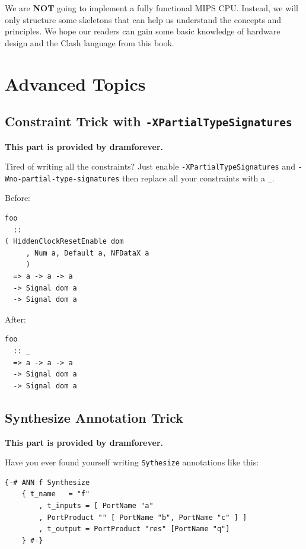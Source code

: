 \documentclass[a4paper,12pt, oneside]{book}
\begin{document}
We are \textbf{NOT} going to implement a fully functional MIPS CPU. Instead, we will only structure some skeletons that can help us understand the concepts and principles. We hope our readers can gain some basic knowledge of hardware design and the Clash language from this book.

\tableofcontents

\mainmatter




\backmatter
\appendix
\chapter{Advanced Topics}
\section*{Constraint Trick with \texttt{-XPartialTypeSignatures}}
\textbf{This part is provided by dramforever.}

Tired of writing all the  constraints? Just enable \texttt{-XPartialTypeSignatures} and \texttt{-Wno-partial-type-signatures} then replace all your constraints with a \texttt{_}.

Before:

\begin{verbatim}
foo 
  ::
( HiddenClockResetEnable dom
     , Num a, Default a, NFDataX a
     )
  => a -> a -> a
  -> Signal dom a
  -> Signal dom a
\end{verbatim}

After:

\begin{verbatim}
foo 
  :: _
  => a -> a -> a
  -> Signal dom a
  -> Signal dom a
\end{verbatim}
\section*{Synthesize Annotation Trick}
\textbf{This part is provided by dramforever.}

Have you ever found yourself writing \texttt{Sythesize} annotations like this:

\begin{verbatim}
{-# ANN f Synthesize
    { t_name   = "f"
        , t_inputs = [ PortName "a"
        , PortProduct "" [ PortName "b", PortName "c" ] ]
        , t_output = PortProduct "res" [PortName "q"]
    } #-}
\end{verbatim}
\end{document}
